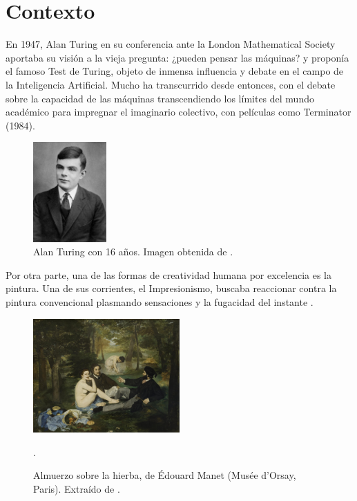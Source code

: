 \documentclass[../main.tex]{subfiles}
\begin{document}
\section{Contexto}
En 1947, Alan Turing en su conferencia ante la London Mathematical Society \cite{Turing1947} aportaba su visión a la vieja pregunta: ¿pueden pensar las máquinas? y proponía el famoso Test de Turing, objeto de inmensa influencia y debate en el campo de la Inteligencia Artificial. Mucho ha transcurrido desde entonces, con el debate sobre la capacidad de las máquinas transcendiendo los límites del mundo académico para impregnar el imaginario colectivo, con películas como Terminator (1984).
\begin{figure}[h!]
    \centering
    \includegraphics[width=0.25\textwidth]{imagenes/Alan_Turing_Aged_16.jpg}
    \caption[Alan Turing con 16 años]{Alan Turing con 16 años. Imagen obtenida de \cite{Desconocido1928}.}
    \label{fig:alan_turing_16}
\end{figure}

Por otra parte, una de las formas de creatividad humana por excelencia es la pintura. Una de sus corrientes, el Impresionismo, buscaba reaccionar contra la pintura convencional plasmando sensaciones y la fugacidad del instante \cite{EditorialSalvat2006}.

\begin{figure}[h!]
    \centering
    \includegraphics[width=0.5\textwidth]{imagenes/Almuerzo sobre la hierba.jpg}
    \caption[Almuerzo sobre la hierba, de Édouard Manet]{Almuerzo sobre la hierba, de Édouard Manet (Musée d'Orsay, Paris). Extraído de \cite{Manet1863}.}.
    \label{fig:manet_almuerzo_hierba}
\end{figure}
\end{document}
